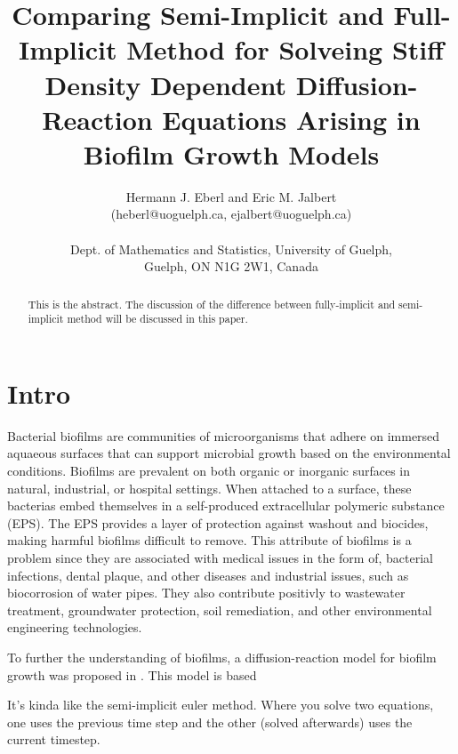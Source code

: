 \documentclass{article}
\begin{document}
\title{Comparing Semi-Implicit and Full-Implicit Method for Solveing Stiff Density Dependent Diffusion-Reaction Equations Arising in Biofilm Growth Models}
\author{Hermann J. Eberl and Eric M. Jalbert\\
  (heberl@uoguelph.ca, ejalbert@uoguelph.ca)\\ \\
  Dept. of Mathematics and Statistics, University of Guelph,\\ 
  Guelph, ON N1G 2W1, Canada}
\maketitle

\begin{abstract}
  This is the abstract. The discussion of the difference between fully-implicit and semi-implicit method will be discussed in this paper.
\end{abstract}

\section{Intro}
  Bacterial biofilms are communities of microorganisms that adhere on immersed aquaeous surfaces that can support microbial growth based on the environmental conditions. 
  Biofilms are prevalent on both organic or inorganic surfaces in natural, industrial, or hospital settings.
  When attached to a surface, these bacterias embed themselves in a self-produced extracellular polymeric substance (EPS).
  The EPS provides a layer of protection against washout and biocides, making harmful biofilms difficult to remove.
  This attribute of biofilms is a problem since they are associated with medical issues in the form of, bacterial infections, dental plaque, and other diseases and industrial issues, such as biocorrosion of water pipes. 
  They also contribute positivly to wastewater treatment, groundwater protection, soil remediation, and other environmental engineering technologies.
  
  
  To further the understanding of biofilms, a diffusion-reaction model for biofilm growth was proposed in \cite{eberl2001deterministic}.
  This model is based 
  
 
   
  It's kinda like the semi-implicit euler method. Where you solve two equations, one uses the previous time step and the other (solved afterwards) uses the current timestep.
 
\end{document}
